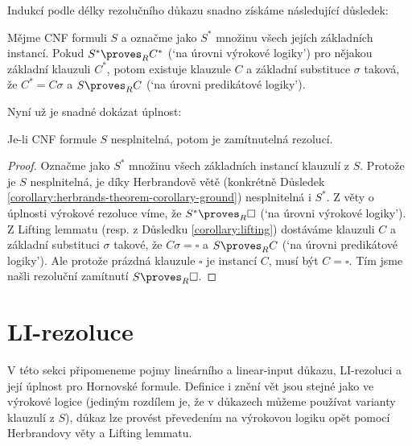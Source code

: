 Indukcí podle délky rezolučního důkazu snadno získáme následující důsledek:

\begin{corollary}\label{corollary:lifting}
Mějme CNF formuli $S$ a označme jako $S^*$ množinu všech jejích základních instancí. Pokud $S^*\proves_R C^*$ (`na úrovni výrokové logiky') pro nějakou základní klauzuli $C^*$, potom existuje klauzule $C$ a základní substituce $\sigma$ taková, že $C^*=C\sigma$ a $S\proves_R C$ (`na úrovni predikátové logiky').
\end{corollary}

Nyní už je snadné dokázat úplnost:

\begin{theorem}\label{theorem:completeness-of-predicate-resolution}
    Je-li CNF formule $S$ nesplnitelná, potom je zamítnutelná rezolucí.
\end{theorem}
\begin{proof}
Označme jako $S^*$ množinu všech základních instancí klauzulí z $S$. Protože je $S$ nesplnitelná, je díky Herbrandově větě (konkrétně Důsledek \ref{corollary:herbrands-theorem-corollary-ground}) nesplnitelná i $S^*$. Z věty o úplnosti \alert{výrokové} rezoluce víme, že $S^*\proves_R\square$ (`na úrovni výrokové logiky'). Z Lifting lemmatu (resp. z Důsledku \ref{corollary:lifting}) dostáváme klauzuli $C$ a základní substituci $\sigma$ takové, že $C\sigma=\square$ a $S\proves_R C$ (`na úrovni predikátové logiky'). Ale protože prázdná klauzule $\square$ je instancí $C$, musí být $C=\square$. Tím jsme našli rezoluční zamítnutí $S\proves_R \square$.
\end{proof}


\section{LI-rezoluce}\label{section:predicate-LI-resolution}

V této sekci připomeneme pojmy \alert{lineárního a linear-input důkazu}, \alert{LI-rezoluci} a její úplnost pro Hornovské formule. Definice i znění vět jsou stejné jako ve výrokové logice (jediným rozdílem je, že v důkazech můžeme používat \alert{varianty} klauzulí z $S$), důkaz lze provést převedením na výrokovou logiku opět pomocí Herbrandovy věty a Lifting lemmatu.


